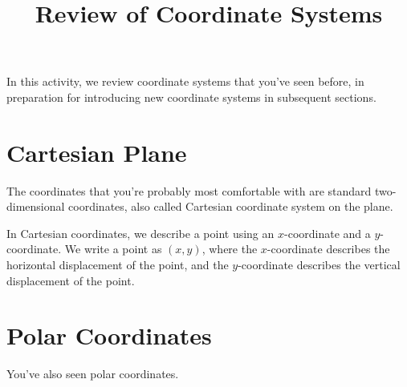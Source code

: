 \documentclass{ximera}
\title{Review of Coordinate Systems}
\begin{document}
\begin{abstract}
\end{abstract}
\maketitle

In this activity, we review coordinate systems that you've seen before, in preparation for introducing new coordinate systems in subsequent sections.

\section*{Cartesian Plane}

The coordinates that you're probably most comfortable with are standard two-dimensional coordinates, also called Cartesian coordinate system on the plane.

In Cartesian coordinates, we describe a point using an $x$-coordinate and a $y$-coordinate. We write a point as $(x,y)$, where the $x$-coordinate describes the horizontal displacement of the point, and the $y$-coordinate describes the vertical displacement of the point.

\begin{image}
\end{image}

\section*{Polar Coordinates}

You've also seen polar coordinates.
\end{document}
